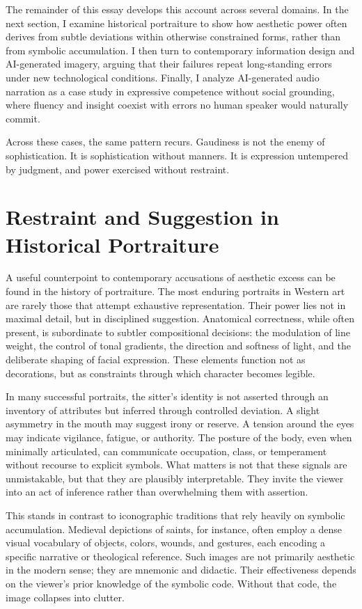 \documentclass[12pt]{article}
\begin{document}
The remainder of this essay develops this account across several domains. In the next section, I examine historical portraiture to show how aesthetic power often derives from subtle deviations within otherwise constrained forms, rather than from symbolic accumulation. I then turn to contemporary information design and AI-generated imagery, arguing that their failures repeat long-standing errors under new technological conditions. Finally, I analyze AI-generated audio narration as a case study in expressive competence without social grounding, where fluency and insight coexist with errors no human speaker would naturally commit.

Across these cases, the same pattern recurs. Gaudiness is not the enemy of sophistication. It is sophistication without manners. It is expression untempered by judgment, and power exercised without restraint.

\section{Restraint and Suggestion in Historical Portraiture}

A useful counterpoint to contemporary accusations of aesthetic excess can be found in the history of portraiture. The most enduring portraits in Western art are rarely those that attempt exhaustive representation. Their power lies not in maximal detail, but in disciplined suggestion. Anatomical correctness, while often present, is subordinate to subtler compositional decisions: the modulation of line weight, the control of tonal gradients, the direction and softness of light, and the deliberate shaping of facial expression. These elements function not as decorations, but as constraints through which character becomes legible.

In many successful portraits, the sitter’s identity is not asserted through an inventory of attributes but inferred through controlled deviation. A slight asymmetry in the mouth may suggest irony or reserve. A tension around the eyes may indicate vigilance, fatigue, or authority. The posture of the body, even when minimally articulated, can communicate occupation, class, or temperament without recourse to explicit symbols. What matters is not that these signals are unmistakable, but that they are plausibly interpretable. They invite the viewer into an act of inference rather than overwhelming them with assertion.

This stands in contrast to iconographic traditions that rely heavily on symbolic accumulation. Medieval depictions of saints, for instance, often employ a dense visual vocabulary of objects, colors, wounds, and gestures, each encoding a specific narrative or theological reference. Such images are not primarily aesthetic in the modern sense; they are mnemonic and didactic. Their effectiveness depends on the viewer’s prior knowledge of the symbolic code. Without that code, the image collapses into clutter.
\end{document}
